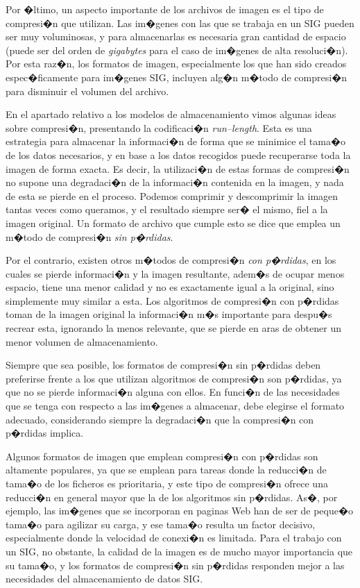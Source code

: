 Por �ltimo, un aspecto importante de los archivos de imagen es el tipo de compresi�n que utilizan. Las im�genes con las que se trabaja en un SIG pueden ser muy voluminosas, y para almacenarlas es necesaria gran cantidad de espacio (puede ser del orden de \emph{gigabytes} para el caso de im�genes de alta resoluci�n). Por esta raz�n, los formatos de imagen, especialmente los que han sido creados  espec�ficamente para im�genes SIG, incluyen alg�n m�todo de compresi�n para disminuir el volumen del archivo.

En el apartado relativo a los modelos de almacenamiento vimos algunas ideas sobre compresi�n, presentando la codificaci�n \emph{run--length}. Esta es una estrategia para almacenar la informaci�n de forma que se minimice el tama�o de los datos necesarios, y en base a los datos recogidos puede recuperarse toda la imagen de forma exacta. Es decir, la utilizaci�n de estas formas de compresi�n no supone una degradaci�n de la informaci�n contenida en la imagen, y nada de esta se pierde en el proceso. Podemos comprimir y descomprimir la imagen tantas veces como queramos, y el resultado siempre ser� el mismo, fiel a la imagen original. Un formato de archivo que cumple esto se dice que emplea un m�todo de compresi�n \emph{sin p�rdidas}.	

Por el contrario, existen otros m�todos de compresi�n \emph{con p�rdidas}, en los cuales se pierde informaci�n y la imagen resultante, adem�s de ocupar menos espacio, tiene una menor calidad y no es exactamente igual a la original, sino simplemente muy similar a esta. Los algoritmos de compresi�n con p�rdidas toman de la imagen original la informaci�n m�s importante para despu�s recrear esta, ignorando la menos relevante, que se pierde en aras de obtener un menor volumen de almacenamiento.

Siempre que sea posible, los formatos de compresi�n sin p�rdidas deben preferirse frente a los que utilizan algoritmos de compresi�n son p�rdidas, ya que no se pierde informaci�n alguna con ellos. En funci�n de las necesidades que se tenga con respecto a las im�genes a almacenar, debe elegirse el formato adecuado, considerando siempre la degradaci�n que la compresi�n con p�rdidas implica.

Algunos formatos de imagen que emplean compresi�n con p�rdidas son altamente populares, ya que se emplean para tareas donde la reducci�n de tama�o de los ficheros es prioritaria, y este tipo de compresi�n ofrece una reducci�n en general mayor que la de los algoritmos sin p�rdidas. As�, por ejemplo, las im�genes que se incorporan en paginas Web han de ser de peque�o tama�o para agilizar su carga, y ese tama�o resulta un factor decisivo, especialmente donde la velocidad de conexi�n es limitada. Para el trabajo con un SIG, no obstante, la calidad de la imagen es de mucho mayor importancia que su tama�o, y los formatos de compresi�n sin p�rdidas responden mejor a las necesidades del almacenamiento de datos SIG.

